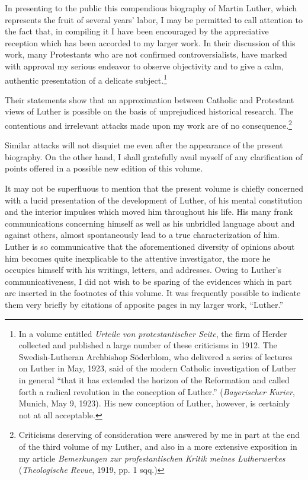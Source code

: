 In presenting to the public this compendious biography of Martin
Luther, which represents the fruit of several years’ labor, I may be
permitted to call attention to the fact that, in compiling it I have
been encouraged by the appreciative reception which has been accorded to my larger work.
In their discussion of this work, many
Protestants who are not confirmed controversialists, have marked
with approval my serious endeavor to observe objectivity and to give
a calm, authentic presentation of a delicate subject.\footnote{
In a volume entitled \textit{Urteile von protestantischer Seite}, the firm of Herder collected and
published a large number of these criticisms in 1912. The Swedish-Lutheran Archbishop
Söderblom, who delivered a series of lectures on Luther in May, 1923, said of the modern
Catholic investigation of Luther in general “that it has extended the horizon of the Reformation and called forth a radical revolution in the conception of Luther.” (\textit{Bayerischer Kurier},
Munich, May 9, 1923). His new conception of Luther, however, is certainly not at all
acceptable.}

Their statements show that an approximation between Catholic and Protestant
views of Luther is possible on the basis of unprejudiced historical research. The contentious and irrelevant attacks made upon my work
are of no consequence.\footnote{
Criticisms deserving of consideration were answered by me in part at the end of the
third volume of my Luther, and also in a more extensive exposition in my article \textit{Bemerkungen zur profestantischen Kritik meines Lutherwerkes} (\textit{Theologische Revue}, 1919, pp. 1 sqq.)}

Similar attacks will not disquiet me even
after the appearance of the present biography. On the other hand,
I shall gratefully avail myself of any clarification of points offered in
a possible new edition of this volume.

It may not be superfluous to mention that the present volume is
chiefly concerned with a lucid presentation of the development of
Luther, of his mental constitution and the interior impulses which
moved him throughout his life. His many frank communications concerning himself as well as his unbridled language about and against
others, almost spontaneously lead to a true characterization of him.
Luther is so communicative that the aforementioned diversity of
opinions about him becomes quite inexplicable to the attentive investigator, the more he occupies himself with his writings, letters, and
addresses. Owing to Luther’s communicativeness, I did not wish to be
sparing of the evidences which in part are inserted in the footnotes
of this volume. It was frequently possible to indicate them very
briefly by citations of apposite pages in my larger work, “Luther.”

